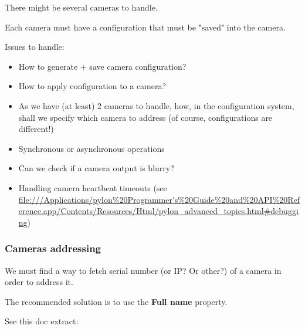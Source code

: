 There might be several cameras to handle.

Each camera must have a configuration that must be "saved" into the camera.

Issues to handle:

\begin{itemize}
    \item How to generate + save camera configuration?
    \item How to apply configuration to a camera?
    \item As we have (at least) 2 cameras to handle, how, in the configuration system,
        shall we specify which camera to address (of course, configurations are different!)
    \item Synchronous or asynchronous operations
    \item Can we check if a camera output is blurry?
    \item Handling camera heartbeat timeouts (see \url{file:///Applications/pylon%20Programmer's%20Guide%20and%20API%20Reference.app/Contents/Resources/Html/pylon_advanced_topics.html#debugging})
\end{itemize}

\subsubsection{Cameras addressing}

We must find a way to fetch serial number (or IP? Or other?) of a camera in order to address it.

The recommended solution is to use the \textbf{Full name} property.

See this doc extract:

